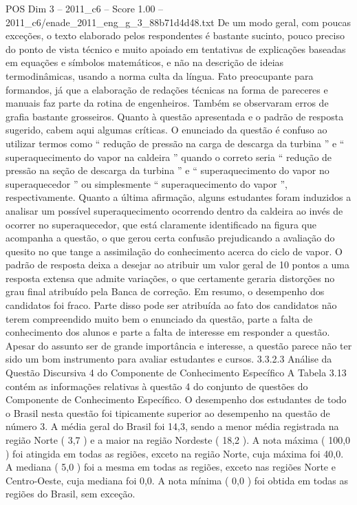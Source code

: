 \begin{textsample}{POS Dim 3 – 2011\_c6 – Score 1.00 – 2011\_c6/enade\_2011\_eng\_g\_3\_88b71d4d48.txt}
De um modo geral, com poucas exceções, o texto elaborado pelos respondentes é bastante sucinto, pouco preciso do ponto de vista técnico e muito apoiado em tentativas de explicações baseadas em equações e símbolos matemáticos, e não na descrição de ideias termodinâmicas, usando a norma culta da língua.
Fato preocupante para formandos, já que a elaboração de redações técnicas na forma de pareceres e manuais faz parte da rotina de engenheiros.
Também se observaram erros de grafia bastante grosseiros.
Quanto à questão apresentada e o padrão de resposta sugerido, cabem aqui algumas críticas.
O enunciado da questão é confuso ao utilizar termos como “ redução de pressão na carga de descarga da turbina ” e “ superaquecimento do vapor na caldeira ” quando o correto seria “ redução de pressão na seção de descarga da turbina ” e “ superaquecimento do vapor no superaquecedor ” ou simplesmente “ superaquecimento do vapor ”, respectivamente.
Quanto a última afirmação, alguns estudantes foram induzidos a analisar um possível superaquecimento ocorrendo dentro da caldeira ao invés de ocorrer no superaquecedor, que está claramente identificado na figura que acompanha a questão, o que gerou certa confusão prejudicando a avaliação do quesito no que tange a assimilação do conhecimento acerca do ciclo de vapor.
O padrão de resposta deixa a desejar ao atribuir um valor geral de 10 pontos a uma resposta extensa que admite variações, o que certamente geraria distorções no grau final atribuído pela Banca de correção.
Em resumo, o desempenho dos candidatos foi fraco.
Parte disso pode ser atribuída ao fato dos candidatos não terem compreendido muito bem o enunciado da questão, parte a falta de conhecimento dos alunos e parte a falta de interesse em responder a questão.
Apesar do assunto ser de grande importância e interesse, a questão parece não ter sido um bom instrumento para avaliar estudantes e cursos. 3.3.2.3 Análise da Questão Discursiva 4 do Componente de Conhecimento Específico A Tabela 3.13 contém as informações relativas à questão 4 do conjunto de questões do Componente de Conhecimento Específico.
O desempenho dos estudantes de todo o Brasil nesta questão foi tipicamente superior ao desempenho na questão de número 3.
A média geral do Brasil foi 14,3, sendo a menor média registrada na região Norte ( 3,7 ) e a maior na região Nordeste ( 18,2 ).
A nota máxima ( 100,0 ) foi atingida em todas as regiões, exceto na região Norte, cuja máxima foi 40,0.
A mediana ( 5,0 ) foi a mesma em todas as regiões, exceto nas regiões Norte e Centro-Oeste, cuja mediana foi 0,0.
A nota mínima ( 0,0 ) foi obtida em todas as regiões do Brasil, sem exceção.

\end{textsample}
